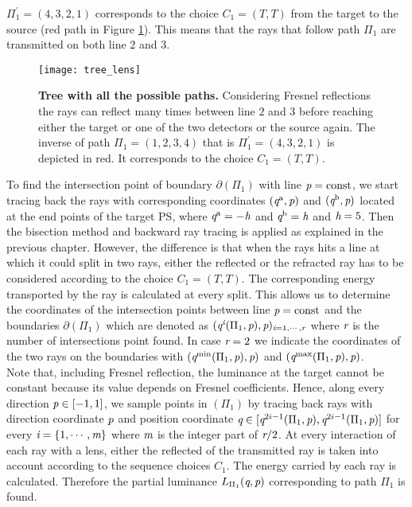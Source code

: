 $\Pi_1^{\prime}=(4,3,2,1)$ corresponds to the choice $C_1= (T,T)$ from the target to the source (red path in Figure \ref{fig:tree_fresnel}). This means that the rays that follow path $\Pi_1$ are transmitted on both line $2$ and $3$. 
\begin{figure}[t]
  \begin{center}
  \texttt{[image: tree\_lens]}
  \end{center}
  \caption{\textbf{Tree with all the possible paths.} Considering Fresnel reflections the rays can reflect many times between line $2$ and $3$ before reaching either the target or one of the two detectors or the source again. The inverse of path $\Pi_1 = (1,2,3,4)$ that is $\Pi_1^{\prime} = (4,3,2,1)$ is depicted in red. It corresponds to the choice $C_1= (T,T)$.}
\label{fig:tree_fresnel}
 \end{figure}
To find the intersection point of boundary $\partial$$(\Pi_1)$ with line $\textit{p} = \textrm{const}$, we start tracing back the rays with corresponding coordinates $(\textit{q}^{\textrm{a}}, \textit{p})$ and $(\textit{q}^{\textrm{b}}, \textit{p})$ located at the end points of the target PS, where $\textit{q}^{\textrm{a}} = -\textit{h}$ and $\textit{q}^{\textrm{b}} = \textit{h}$ and $\textit{h}=5$. Then the bisection method and backward ray tracing is applied as explained in the previous chapter. However, the difference is that when the rays hits a line at which it could split in two rays, either the reflected or the refracted ray has to be considered according to the choice $C_1= (T,T)$. The corresponding energy transported by the ray is calculated at every split. This allows us to determine the coordinates of the intersection points between line $\textit{p}=\textrm{const}$ and the boundaries $\partial$$(\Pi_1)$ which are denoted as $(\textit{q}^{\textit{i}}(\Pi_1, \textit{p}), \textit{p})_{\textit{i}=1, \cdots, \textit{r}}$ where $\textit{r}$ is the number of intersections point found. In case $\textit{r}=2$ we indicate the coordinates of the two rays on the boundaries with $(\textit{q}^{\textrm{min}}(\Pi_1, \textit{p}), \textit{p})$ and $(\textit{q}^{\textrm{max}}(\Pi_1, \textit{p}), \textit{p})$. \\ \indent
Note that, including Fresnel reflection, the luminance at the target cannot be constant because its value depends on Fresnel coefficients. Hence, along every direction $\textit{p}\in[-1,1]$, we sample points in $(\Pi_1)$ by tracing back rays with direction coordinate $\textit{p}$ and position coordinate $\textit{q}\in[\textit{q}^{2i-1}(\Pi_1, \textit{p}), \textit{q}^{2i-1}(\Pi_1, \textit{p})]$ for every $\textit{i}=\{1, \cdots, \textit{m}\}$ where $\textit{m}$ is the integer part of $\textit{r}/2$. At every interaction of each ray with a lens, either the reflected of the transmitted ray is taken into account according to the sequence choices $C_1$. The energy carried by each ray is calculated. Therefore the partial luminance $L_{\Pi_1}(\textit{q},\textit{p})$ corresponding to path $\Pi_1$ is found. 
